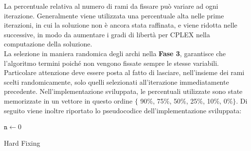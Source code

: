 La percentuale relativa al numero di rami da fissare può variare ad ogni iterazione. Generalmente viene utilizzata una percentuale alta nelle prime iterazioni, in cui la soluzione non è ancora stata raffinata, e viene ridotta nelle successive, in modo da aumentare i gradi di libertà per CPLEX nella computazione della soluzione.\\
La selezione in maniera randomica degli archi nella \textbf{Fase 3}, garantisce che l'algoritmo termini poiché non vengono fissate sempre le stesse variabili. 
Particolare attenzione deve essere posta al fatto di lasciare, nell'insieme dei rami scelti randomicamente, solo quelli selezionati all'iterazione immediatamente precedente. Nell'implementazione sviluppata, le percentuali utilizzate sono state memorizzate in un vettore in questo ordine $\lbrace$ 90\%, 75\%, 50\%, 25\%, 10\%, 0\%$\rbrace$.
Di seguito viene inoltre riportato lo pseudocodice dell'implementazione sviluppata:\\
\begin{algorithm}[h]
\DontPrintSemicolon
{}
\BlankLine
$\mathtt{n \gets}0$\;
\BlankLine
{}
\caption{Hard Fixing}
\end{algorithm}

